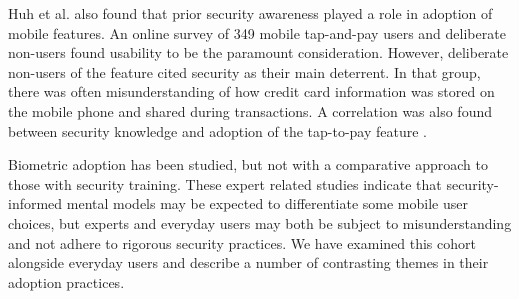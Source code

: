 
Huh et al. also found that prior security awareness played a role in adoption of mobile features. An online survey of 349 mobile tap-and-pay users and deliberate non-users found usability to be the paramount consideration. However, deliberate non-users of the feature cited security as their main deterrent. In that group, there was often misunderstanding of how credit card information was stored on the mobile phone and shared during transactions. A correlation was also found between security knowledge and adoption of the tap-to-pay feature \cite{huh2017don}.

Biometric adoption has been studied, but not with a comparative approach to those with security training. These expert related studies indicate that security-informed mental models may be expected to differentiate some mobile user choices, but experts and everyday users may both be subject to misunderstanding and not adhere to rigorous security practices. We have examined this cohort alongside everyday users and describe a number of contrasting themes in their adoption practices.  

